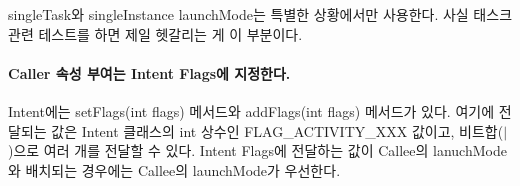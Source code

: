 singleTask와 singleInstance launchMode는 특별한 상황에서만 사용한다. 사실 태스크 관련 테스트를 하면 제일 헷갈리는 게 이 부분이다.

\paragraph{Caller 속성 부여는 Intent Flags에 지정한다.}
Intent에는 setFlags(int flags) 메서드와 addFlags(int flags) 메서드가 있다. 여기에 전달되는 값은 Intent 클래스의 int 상수인 FLAG\_ACTIVITY\_XXX 값이고, 비트합($|$)으로 여러 개를 전달할 수 있다. 
Intent Flags에 전달하는 값이 Callee의 lanuchMode와 배치되는 경우에는 Callee의 launchMode가 우선한다.\\

